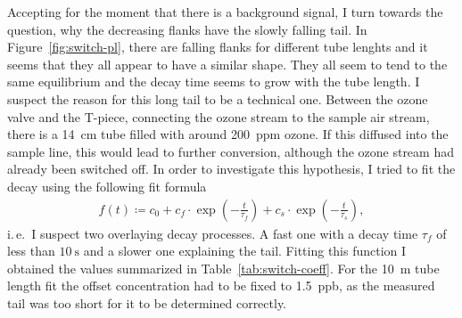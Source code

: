 Accepting for the moment that there is a background  signal, I
turn towards the question, why the decreasing flanks have the slowly
falling tail. In Figure~\ref{fig:switch-pl}, there are falling flanks
for different tube lenghts and it seems that they all appear to
have a similar shape. They all seem to tend to the same equilibrium
and the decay time seems to grow with the tube length. I suspect the
reason for this long tail to be a technical one. Between the ozone
valve and the T-piece, connecting the ozone stream to the sample air
stream, there is a \SI{14}{\centi\meter} tube filled with around
\SI{200}{ppm} ozone. If this diffused into the sample line, this would
lead to further  conversion, although the ozone stream had
already been switched off. In order to investigate this hypothesis, I
tried to fit the decay using the following fit formula
\begin{align}
  f(t) \coloneqq c_0 + c_f \cdot\exp\left( -\frac{t}{\tau_f}\right) +
  c_s \cdot \exp\left(-\frac{t}{\tau_s}\right), \label{eq:switch-fit}
\end{align}
i.\,e.\ I suspect two overlaying decay processes. A fast one with a
decay time $\tau_f$ of less than $\SI{10}{\second}$ and a slower one
explaining the tail. Fitting this function I obtained the values
summarized in Table~\ref{tab:switch-coeff}. For the \SI{10}{\meter}
tube length fit the offset concentration had to be fixed to
\SI{1.5}{ppb}, as the measured tail was too short for it to be
determined correctly.


